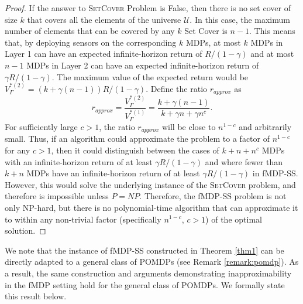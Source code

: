 \documentclass[twocolumn]{autart}    %
\begin{document}
\begin{proof}
  
  If the answer to \textsc{SetCover} Problem is False, then there is no set cover of size $k$ that covers all the elements of the universe $\mathcal{U}$. In this case, the maximum number of elements that can be covered by any $k$ Set Cover is $n-1$. This means that, by deploying sensors on the corresponding $k$ MDPs, at most $k$ MDPs in Layer 1 can have an expected infinite-horizon return of $R/(1-\gamma)$ and at most $n-1$ MDPs in Layer 2 can have an expected infinite-horizon return of $\gamma R/(1-\gamma)$. The maximum value of the expected return would be $V_{\Gamma}^{*(2)} = (k+ \gamma(n-1)) R/(1-\gamma)$. Define the ratio $r_{approx}$ as
  \begin{equation} \label{eq:badratio}
      r_{approx} = \frac{V_{\Gamma}^{*(2)}}{V_{\Gamma}^{*(1)}} = \frac{k+ \gamma (n-1)}{k+\gamma n+ \gamma n^c}.
  \end{equation}
For sufficiently large $c>1$, the ratio $r_{approx}$ will be close to $n^{1-c}$ and arbitrarily small. Thus, if an algorithm could approximate the problem to a factor of $n^{1- c}$ for any $c > 1$, then it could distinguish between the cases of $k+n+n^c$ MDPs with an infinite-horizon return of at least $\gamma R/(1-\gamma)$ and where fewer than $k+n$ MDPs have an infinite-horizon return of at least $\gamma R/(1-\gamma)$ in fMDP-SS. However, this would solve the underlying instance of the \textsc{SetCover} problem, and therefore is impossible unless $P = NP$. Therefore, the fMDP-SS problem is not only NP-hard, but there is no polynomial-time algorithm that can approximate it to within any non-trivial factor (specifically $n^{1- c}$, $c>1$) of the optimal solution. 
\end{proof}

 
 We note that the instance of fMDP-SS constructed in Theorem \ref{thm1} can be directly adapted to a general class of POMDPs (see Remark \ref{remark:pomdp}).  As a result, the same construction and arguments demonstrating inapproximability in the fMDP setting hold for the general class of POMDPs. We formally state this result below. \\
 
 
\end{document}
